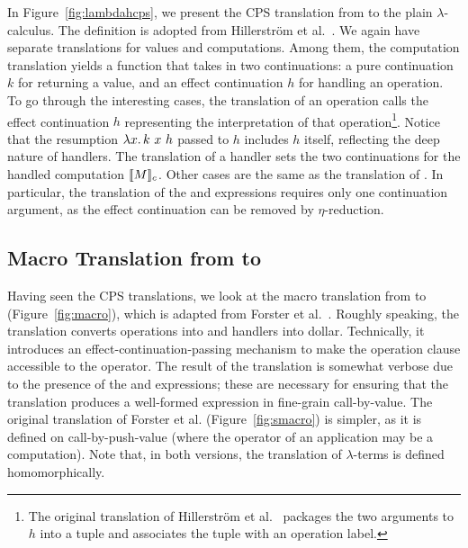 In Figure~\ref{fig:lambdahcps}, we present the CPS translation from
\lambdah to the plain $\lambda$-calculus.
The definition is adopted from Hillerstr\"om et al.~\cite{hillerstrom-cps}.
We again have separate translations for values and computations.
Among them, the computation translation yields a function that takes in two
continuations: a pure continuation $k$ for returning a value, and an effect
continuation $h$ for handling an operation.
To go through the interesting cases, the translation of an operation
calls the effect continuation $h$ representing the interpretation of that
operation\footnote{The original translation of
Hillerstr\"om et al.~\cite{hillerstrom-cps} packages the two arguments to
$h$ into a tuple and associates the tuple with an operation label.}.
Notice that the resumption $\lambda x.\, k \ x \ h$ passed to $h$
includes $h$ itself, reflecting the deep nature of handlers.
The translation of a handler sets the two continuations for the
handled computation $\llbracket M \rrbracket_c$.
Other cases are the same as the translation of \lambdasz.
In particular, the translation of the \returntt and  expressions 
requires only one continuation argument, as the effect continuation can 
be removed by $\eta$-reduction.


\subsection{Macro Translation from \lambdah to \lambdasz}
\label{sec:cps:macro}

\Macro

\SMacro

Having seen the CPS translations, we look at the macro translation from
\lambdah to \lambdasz (Figure~\ref{fig:macro}), which is adapted from
Forster et al.~\cite{forster-jfp}.
Roughly speaking, the translation converts operations into \shiftztt
and handlers into dollar.
Technically, it introduces an effect-continuation-passing mechanism to
make the operation clause accessible to the \shiftztt operator.
The result of the translation is somewhat verbose due to the presence of
the \returntt and  expressions; these are necessary for ensuring that
the translation produces a well-formed expression in fine-grain call-by-value.
The original translation of Forster et al. (Figure~\ref{fig:smacro}) is
simpler, as it is defined on call-by-push-value (where the operator of an
application may be a computation).
Note that, in both versions, the translation of $\lambda$-terms is defined
homomorphically.


